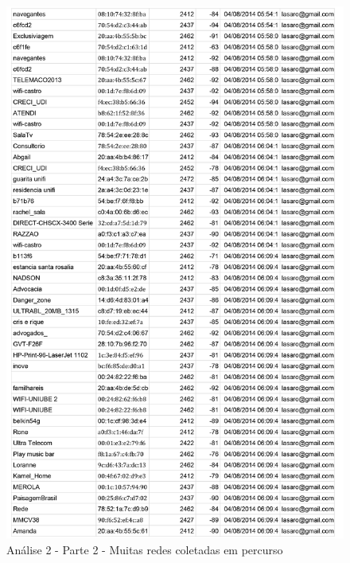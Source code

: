 \documentclass[12pt, %
openright, 
oneside,
a4paper,
brazil]{facom-ufu-abntex2}
\begin{document}
\begin{figure}[hbt]
  \includegraphics[scale=0.8]{analise202}
  \caption{Análise 2 - Parte 2 - Muitas redes coletadas em percurso}
\end{figure}
\end{document}
